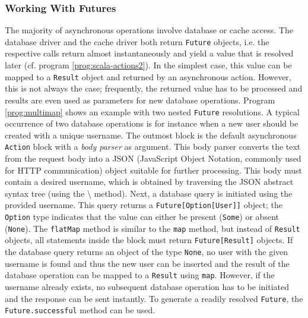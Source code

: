 \subsubsection*{Working With Futures}
The majority of asynchronous operations involve database or cache access. The database driver and the cache driver both return \texttt{Future} objects, i.e. the respective calls return almost instantaneously and yield a value that is resolved later (cf. program \ref{prog:scala-actions2}). In the simplest case, this value can be mapped to a \texttt{Result} object and returned by an asynchronous action. However, this is not always the case; frequently, the returned value has to be processed and results are even used as parameters for new database operations. Program \ref{prog:multimap} shows an example with two nested \texttt{Future} resolutions. A typical occurrence of two database operations is for instance when a new user should be created with a unique username. The outmost block is the default asynchronous \texttt{Action} block with a \textit{body parser} as argument. This body parser converts the text from the request body into a JSON (JavaScript Object Notation, commonly used for HTTP communication) object suitable for further processing. This body must contain a desired username, which is obtained by traversing the JSON abstract syntax tree (using the \textbackslash{} method). Next, a database query is initiated using the provided username. This query returns a \texttt{Future[Option[User]]} object; the \texttt{Option} type indicates that the value can either be present (\texttt{Some}) or absent (\texttt{None}). The \texttt{flatMap} method is similar to the \texttt{map} method, but instead of \texttt{Result} objects, all statements inside the block must return \texttt{Future[Result]} objects. If the database query returns an object of the type \texttt{None}, no user with the given username is found and thus the new user can be inserted and the result of the database operation can be mapped to a \texttt{Result} using \texttt{map}. However, if the username already exists, no subsequent database operation has to be initiated and the response can be sent instantly. To generate a readily resolved \texttt{Future}, the \texttt{Future.successful} method can be used.

